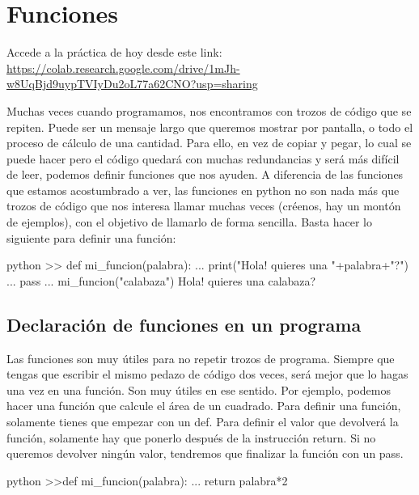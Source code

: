 \documentclass{article}
\begin{document}
\section{Funciones}
Accede a la práctica de hoy desde este link:
\url{https://colab.research.google.com/drive/1mJh-w8UqBjd9uypTVIyDu2oL77a62CNO?usp=sharing}

Muchas veces cuando programamos, nos encontramos con trozos de código que se repiten. Puede ser un mensaje largo que queremos mostrar por pantalla, o todo el proceso de cálculo de una cantidad. Para ello, en vez de copiar y pegar, lo cual se puede hacer pero el código quedará con muchas redundancias y será más difícil de leer, podemos definir funciones que nos ayuden. A diferencia de las funciones que estamos acostumbrado a ver, las funciones en python no son nada más que trozos de código que nos interesa llamar muchas veces (créenos, hay un montón de ejemplos), con el objetivo de llamarlo de forma sencilla. Basta hacer lo siguiente para definir una función:
\begin{mintedbox}{python}
>> def mi_funcion(palabra):
...     print("Hola! quieres una "+palabra+"?")
...     pass
... mi_funcion("calabaza")
Hola! quieres una calabaza?
\end{mintedbox}
\subsection{Declaración de funciones en un programa}
Las funciones son muy útiles para no repetir trozos de programa. Siempre que tengas que escribir el mismo pedazo de código dos veces, será mejor que lo hagas una vez en una función. Son muy útiles en ese sentido. Por ejemplo, podemos hacer una función que calcule el área de un cuadrado. Para definir una función, solamente tienes que empezar con un def. Para definir el valor que devolverá la función, solamente hay que ponerlo después de la instrucción return. Si no queremos devolver ningún valor, tendremos que finalizar la función con un pass.
\begin{mintedbox}{python}
>>def mi_funcion(palabra):
...     return palabra*2
\end{mintedbox}
\end{document}
